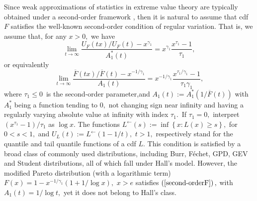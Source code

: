 \documentclass[reqno,openbib,runningheads,a4paper,12pt]{amsart}%
\begin{document}
\noindent Since weak approximations of statistics in extreme value theory are
typically obtained under a second-order framework
\citep[see, e.g., page 48  in] []{deHF06}, then it is natural to assume that
cdf $F$ satisfies the well-known second-order condition of regular variation.
That is, we assume that, for any $x>0,$ we have%
\[
\lim_{t\rightarrow\infty}\frac{U_{F}\left(  tx\right)  /U_{F}\left(  t\right)
-x^{\gamma_{1}}}{A_{1}^{\ast}\left(  t\right)  }=x^{\gamma_{1}}\dfrac
{x^{\tau_{1}}-1}{\tau_{1}},
\]
or equivalently%
\begin{equation}
\lim_{t\rightarrow\infty}\frac{\overline{F}\left(  tx\right)  /\overline
{F}\left(  t\right)  -x^{-1/\gamma_{1}}}{A_{1}\left(  t\right)  }%
=x^{-1/\gamma_{1}}\frac{x^{\tau_{1}/\gamma_{1}}-1}{\tau_{1}\gamma_{1}},
\label{second-orderF}%
\end{equation}
where $\tau_{1}\leq0$\ is the second-order parameter,and $A_{1}\left(
t\right)  :=A_{1}^{\ast}\left(  1/\overline{F}\left(  t\right)  \right)  $
with $A_{1}^{\ast}$ being a function tending to $0,$ not changing sign near
infinity and having a regularly varying absolute value at infinity with index
$\tau_{1}.$\ If $\tau_{1}=0,$ interpret $\left(  x^{\tau_{1}}-1\right)
/\tau_{1}$ as $\log x.$ The functions $L^{\leftarrow}\left(  s\right)
:=\inf\left\{  x:L\left(  x\right)  \geq s\right\}  ,$ for $0<s<1,$ and
$U_{L}\left(  t\right)  :=L^{\leftarrow}\left(  1-1/t\right)  ,$ $t>1,$
respectively stand for the quantile and tail quantile functions of a cdf $L.$
This condition is satisfied by a broad class of commonly used distributions,
including Burr, F\'{e}chet, GPD, GEV and Student distributions, all of which
fall under Hall's model. However, the modified Pareto distribution (with a
logarithmic term) $F\left(  x\right)  =1-x^{-1/\gamma_{1}}\left(  1+1/\log
x\right)  ,$ $x>e$ satisfies $\left(  \ref{second-orderF}\right)  ,$ with
$A_{1}\left(  t\right)  =1/\log t,$ yet it does not belong to Hall's class.
\end{document}
